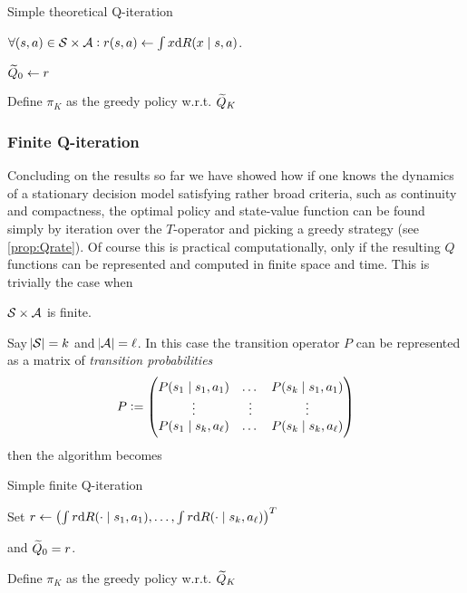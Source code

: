 \begin{algorithm}[H] %
\caption{Simple theoretical Q-iteration}
$\forall (s, a) \in \mathcal{S} \times \mathcal{A} :
r(s, a) \leftarrow \int x \mathrm{d} R(x \mid s, a)$.

$\widetilde{Q}_0 \leftarrow r$

Define $\pi_K$ as the greedy policy w.r.t. $\widetilde{Q}_K$ \\
\label{alg:theoSimpleQ}
\end{algorithm}

\subsubsection{Finite Q-iteration}
Concluding on the results so far
we have showed how if one knows the dynamics
of a stationary decision model satisfying rather broad criteria, 
such as continuity and compactness,
the optimal policy and state-value function can be found
simply by iteration over the $T$-operator and picking a greedy strategy
(see \cref{prop:Qrate}).
Of course this is practical computationally, only if
the resulting $Q$ functions can be represented and computed in finite
space and time.
This is trivially the case when
\begin{asm}
  $\mathcal{S}\times\mathcal{A}$ is finite.
  \label{asm:finite}
\end{asm}
Say $\abs{\mathcal{S}} = k$ and $\abs{\mathcal{A}} = \ell$.
In this case the transition operator $P$ can be represented as a
matrix of \emph{transition probabilities}
\[ P \vcentcolon= \begin{pmatrix}
    P(s_1 \mid s_1, a_1) & \dots & P(s_k \mid s_1, a_1)
    \\ \vdots & \vdots & \vdots
    \\ P(s_1 \mid s_k, a_\ell) & \dots & P(s_k \mid s_k, a_\ell)
\end{pmatrix} \]
then the algorithm becomes

\begin{algorithm}[H] %
\caption{Simple finite Q-iteration}
Set $ r \leftarrow \left(\int r \mathrm{d} R(\cdot \mid s_1, a_1),
\dots, \int r \mathrm{d} R(\cdot \mid s_k, a_\ell) \right)^T $

and $ \widetilde{Q}_0 = r$.

Define $\pi_K$ as the greedy policy w.r.t. $\widetilde{Q}_K$ \\
\label{alg:finiteSimpleQ}
\end{algorithm}

